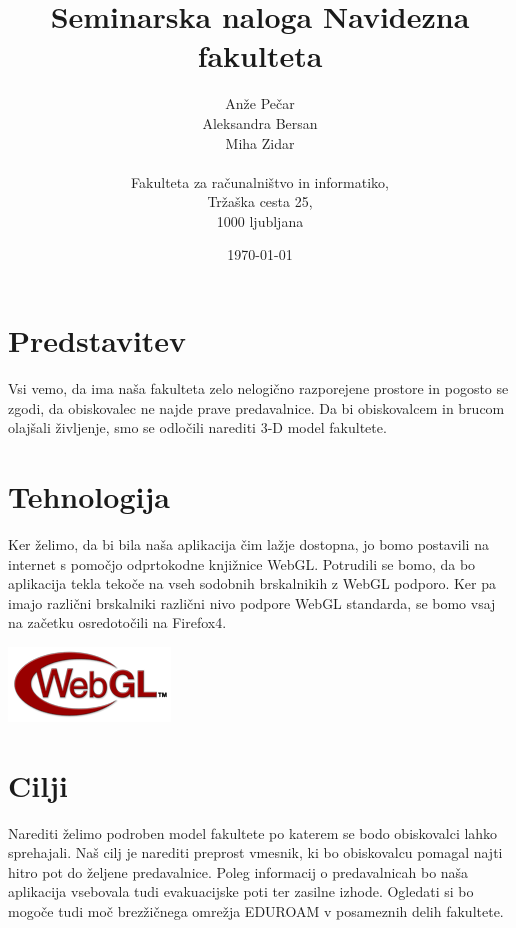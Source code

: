 \documentclass{article}
\begin{document}
\title{Seminarska naloga Navidezna fakulteta}
\author{Anže Pečar\\
        Aleksandra Bersan\\
        Miha Zidar\\\\
	    Fakulteta za računalništvo in informatiko,\\
		Tržaška cesta 25,\\
		1000 ljubljana\\}		
\date{\today}
\maketitle
\pagebreak
\section{Predstavitev}
Vsi vemo, da ima naša fakulteta zelo nelogično razporejene prostore in pogosto se zgodi, da obiskovalec ne najde prave predavalnice. Da bi obiskovalcem in brucom olajšali življenje,
smo se odločili narediti 3-D model fakultete.
\section{Tehnologija}
Ker želimo, da bi bila naša aplikacija čim lažje dostopna, jo bomo postavili na internet s pomočjo odprtokodne knjižnice WebGL. Potrudili se bomo, da bo aplikacija tekla tekoče na vseh sodobnih brskalnikih z WebGL podporo. Ker pa imajo različni brskalniki različni nivo podpore WebGL standarda, se bomo vsaj na začetku osredotočili na Firefox4. \\
\begin{center}
\includegraphics{./WebGL.png}
\end{center}
\section{Cilji}
Narediti želimo podroben model fakultete po katerem se bodo obiskovalci lahko sprehajali. Naš cilj je narediti preprost vmesnik, ki bo obiskovalcu pomagal najti hitro pot do željene predavalnice. Poleg informacij o predavalnicah bo naša aplikacija vsebovala tudi evakuacijske poti ter zasilne izhode. Ogledati si bo mogoče tudi moč brezžičnega omrežja EDUROAM v posameznih delih fakultete.
\end{document}
